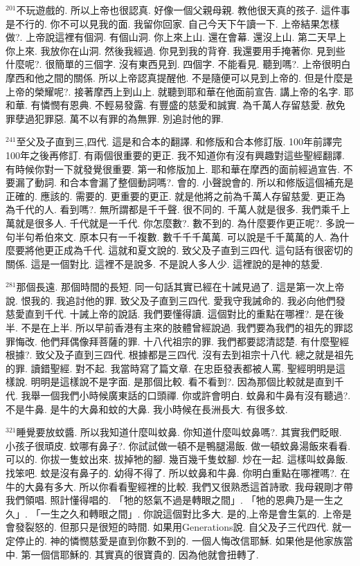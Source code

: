 \documentclass{book}
\begin{document}
$^{201}$不玩遊戲的.
所以上帝也很認真.
好像一個父親母親.
教他很天真的孩子.
這件事是不行的.
你不可以見我的面.
我留你回家.
自己今天下午讀一下.
上帝結果怎樣做?.
上帝說這裡有個洞.
有個山洞.
你上來上山.
還在會幕.
還沒上山.
第二天早上你上來.
我放你在山洞.
然後我經過.
你見到我的背脊.
我還要用手掩著你.
見到些什麼呢?.
很簡單的三個字.
沒有東西見到.
四個字.
不能看見.
聽到嗎?.
上帝很明白摩西和他之間的關係.
所以上帝認真提醒他.
不是隨便可以見到上帝的.
但是什麼是上帝的榮耀呢?.
接著摩西上到山上.
就聽到耶和華在他面前宣告.
講上帝的名字.
耶和華.
有憐憫有恩典.
不輕易發露.
有豐盛的慈愛和誠實.
為千萬人存留慈愛.
赦免罪孽過犯罪惡.
萬不以有罪的為無罪.
別追討他的罪.

$^{241}$至父及子直到三,四代.
這是和合本的翻譯.
和修版和合本修訂版.
100年前譯完100年之後再修訂.
有兩個很重要的更正.
我不知道你有沒有興趣對這些聖經翻譯.
有時候你對一下就發覺很重要.
第一和修版加上.
耶和華在摩西的面前經過宣告.
不要漏了動詞.
和合本會漏了整個動詞嗎?.
會的.
小聲說會的.
所以和修版這個補充是正確的.
應該的.
需要的.
更重要的更正.
就是他將之前為千萬人存留慈愛.
更正為為千代的人.
看到嗎?.
無所謂都是千千聲.
很不同的.
千萬人就是很多.
我們乘千上萬就是很多人.
千代就是一千代.
你怎麼數?.
數不到的.
為什麼要作更正呢?.
多說一句半句希伯來文.
原本只有一千複數.
數千千千萬萬.
可以說是千千萬萬的人.
為什麼要將他更正成為千代.
這就和夏文說的.
致父及子直到三四代.
這句話有很密切的關係.
這是一個對比.
這裡不是說多.
不是說人多人少.
這裡說的是神的慈愛.

$^{281}$那個長遠.
那個時間的長短.
同一句話其實已經在十誡見過了.
這是第一次上帝說.
恨我的.
我追討他的罪.
致父及子直到三四代.
愛我守我誡命的.
我必向他們發慈愛直到千代.
十誡上帝的說話.
我們要懂得讀.
這個對比的重點在哪裡?.
是在後半.
不是在上半.
所以早前香港有主來的肢體曾經說過.
我們要為我們的祖先的罪認罪悔改.
他們拜偶像拜菩薩的罪.
十八代祖宗的罪.
我們都要認清認楚.
有什麼聖經根據?.
致父及子直到三四代.
根據都是三四代.
沒有去到祖宗十八代.
總之就是祖先的罪.
讀錯聖經.
對不起.
我當時寫了篇文章.
在忠臣發表都被人罵.
聖經明明是這樣說.
明明是這樣說不是字面.
是那個比較.
看不看到?.
因為那個比較就是直到千代.
我舉一個我們小時候廣東話的口頭禪.
你或許會明白.
蚊鼻和牛鼻有沒有聽過?.
不是牛鼻.
是牛的大鼻和蚊的大鼻.
我小時候在長洲長大.
有很多蚊.

$^{321}$睡覺要放蚊醬.
所以我知道什麼叫蚊鼻.
你知道什麼叫蚊鼻嗎?.
其實我們眨眼.
小孩子很頑皮.
蚊哪有鼻子?.
你試試做一頓不是鴨腿湯飯.
做一頓蚊鼻湯飯來看看.
可以的.
你拔一隻蚊出來.
拔掉牠的腳.
幾百幾千隻蚊腳.
炒在一起.
這樣叫蚊鼻飯.
找笨吧.
蚊是沒有鼻子的.
幼得不得了.
所以蚊鼻和牛鼻.
你明白重點在哪裡嗎?.
在牛的大鼻有多大.
所以你看看聖經裡的比較.
我們又很熟悉這首詩歌.
我母親剛才帶我們領唱.
照計懂得唱的.
「牠的怒氣不過是轉眼之間」.
「牠的恩典乃是一生之久」.
「一生之久和轉眼之間」.
你說這個對比多大.
是的,上帝是會生氣的.
上帝是會發裂怒的.
但那只是很短的時間.
如果用Generations說.
自父及子三代四代.
就一定停止的.
神的憐憫慈愛是直到你數不到的.
一個人悔改信耶穌.
如果他是他家族當中.
第一個信耶穌的.
其實真的很寶貴的.
因為他就會扭轉了.
\end{document}
